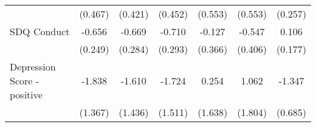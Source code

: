 {\begin{tabular}{l*{6}{c}}
            &     (0.467)         &     (0.421)         &     (0.452)         &     (0.553)         &     (0.553)         &     (0.257)         \\
\addlinespace
SDQ Conduct &      -0.656\sym{**} &      -0.669\sym{*}  &      -0.710\sym{*}  &      -0.127         &      -0.547         &       0.106         \\
            &     (0.249)         &     (0.284)         &     (0.293)         &     (0.366)         &     (0.406)         &     (0.177)         \\
\addlinespace
Depression Score - positive&      -1.838         &      -1.610         &      -1.724         &       0.254         &       1.062         &      -1.347\sym{*}  \\
            &     (1.367)         &     (1.436)         &     (1.511)         &     (1.638)         &     (1.804)         &     (0.685)         \\
\bottomrule
\end{tabular}
}
